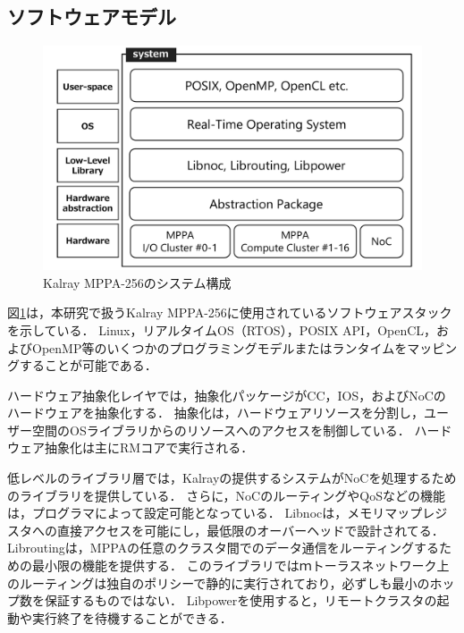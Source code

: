 \documentclass[submit,techrep]{ipsj_v2/UTF8/ipsj}
\begin{document}
\subsection{ソフトウェアモデル}
\label{sec:software_model}

\begin{figure}[t]
  \centering
  \includegraphics[width=0.8\linewidth]{../figure/softwarestack.pdf}
  \caption{\label{fig:software_stack}
    Kalray MPPA-256のシステム構成}
\end{figure}

図\ref{fig:software_stack}は，本研究で扱うKalray MPPA-256に使用されているソフトウェアスタックを示している．
Linux，リアルタイムOS（RTOS），POSIX API，OpenCL，およびOpenMP等のいくつかのプログラミングモデルまたはランタイムをマッピングすることが可能である．

ハードウェア抽象化レイヤでは，抽象化パッケージがCC，IOS，およびNoCのハードウェアを抽象化する．
抽象化は，ハードウェアリソースを分割し，ユーザー空間のOSライブラリからのリソースへのアクセスを制御している．
ハードウェア抽象化は主にRMコアで実行される．

低レベルのライブラリ層では，Kalrayの提供するシステムがNoCを処理するためのライブラリを提供している．
さらに，NoCのルーティングやQoSなどの機能は，プログラマによって設定可能となっている．
Libnocは，メモリマップレジスタへの直接アクセスを可能にし，最低限のオーバーヘッドで設計されてる．
Libroutingは，MPPAの任意のクラスタ間でのデータ通信をルーティングするための最小限の機能を提供する．
このライブラリではｍトーラスネットワーク上のルーティングは独自のポリシーで静的に実行されており，必ずしも最小のホップ数を保証するものではない．
Libpowerを使用すると，リモートクラスタの起動や実行終了を待機することができる．
\end{document}
